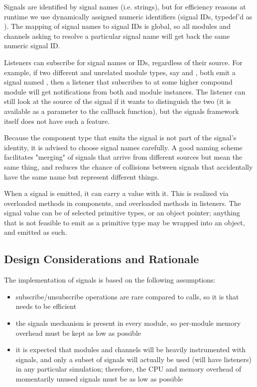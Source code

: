 Signals are identified by signal names (i.e. strings), but for efficiency reasons
at runtime we use dynamically assigned numeric identifiers (signal IDs,
typedef'd as ). The mapping of signal names to signal IDs is
global, so all modules and channels asking to resolve a particular signal name
will get back the same numeric signal ID.

Listeners can subscribe for signal names or IDs, regardless of their
source. For example, if two different and unrelated module types, say
 and , both emit a signal named , then
a listener that subscribes to  at some higher compound module
will get notifications from both  and  module
instances. The listener can still look at the source of the signal if it
wants to distinguish the two (it is available as a parameter to the
callback function), but the signals framework itself does not have such a
feature.

\begin{note}
  Because the component type that emits the signal is not part of the signal's
  identity, it is advised to choose signal names carefully. A good naming scheme
  facilitates "merging" of signals that arrive from different sources but
  mean the same thing, and reduces the chance of collisions between signals that
  accidentally have the same name but represent different things.
\end{note}

When a signal is emitted, it can carry a value with it. This is realized via
overloaded  methods in components, and overloaded 
methods in listeners. The signal value can be of selected primitive types, or an
object pointer; anything that is not feasible to emit as a primitive type may be
wrapped into an object, and emitted as such.

\subsection{Design Considerations and Rationale}

The implementation of signals is based on the following assumptions:

\begin{itemize}
  \item subscribe/unsubscribe operations are rare compared to 
    calls, so it is  that needs to be efficient
  \item the signals mechanism is present in every module, so per-module
    memory overhead must be kept as low as possible
  \item it is expected that modules and channels will be heavily instrumented
    with signals, and only a subset of signals will actually be used
    (will have listeners) in any particular simulation; therefore,
    the CPU and memory overhead of momentarily unused signals must be
    as low as possible
\end{itemize}

